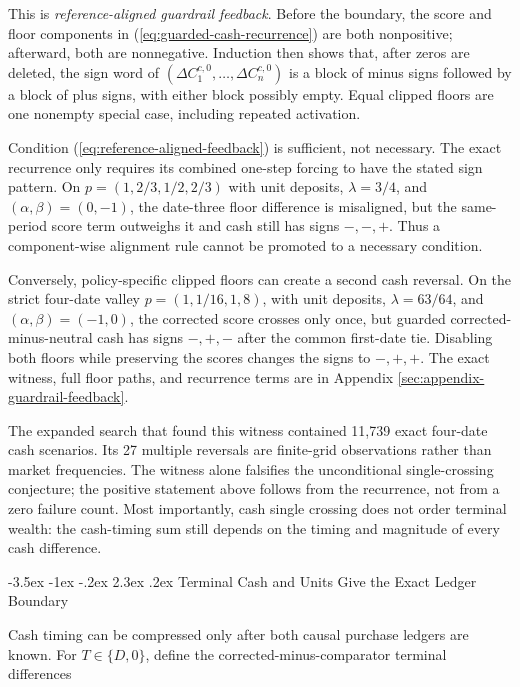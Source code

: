 \documentclass[12pt,a4paper,oneside]{report}
\makeatletter
\renewcommand\section{\@startsection{section}{1}{\z@}%
  {-3.5ex \@plus -1ex \@minus -.2ex}%
  {2.3ex \@plus .2ex}%
  {\normalfont\fontsize{14}{17}\selectfont\bfseries}}
\makeatother
\begin{document}
This is \emph{reference-aligned guardrail feedback}. Before the boundary, the
score and floor components in (\ref{eq:guarded-cash-recurrence}) are both
nonpositive; afterward, both are nonnegative. Induction then shows that, after
zeros are deleted, the sign word of
$(\Delta C_1^{c,0},\ldots,\Delta C_n^{c,0})$ is a block of minus signs followed
by a block of plus signs, with either block possibly empty. Equal clipped
floors are one nonempty special case, including repeated activation.

Condition (\ref{eq:reference-aligned-feedback}) is sufficient, not necessary.
The exact recurrence only requires its combined one-step forcing to have the
stated sign pattern. On
$p=(1,2/3,1/2,2/3)$ with unit deposits, $\lambda=3/4$, and
$(\alpha,\beta)=(0,-1)$, the date-three floor difference is misaligned, but
the same-period score term outweighs it and cash still has signs $-,-,+$.
Thus a component-wise alignment rule cannot be promoted to a necessary
condition.

Conversely, policy-specific clipped floors can create a second cash reversal.
On the strict four-date valley
$p=(1,1/16,1,8)$, with unit deposits, $\lambda=63/64$, and
$(\alpha,\beta)=(-1,0)$, the corrected score crosses only once, but guarded
corrected-minus-neutral cash has signs $-,+,-$ after the common first-date
tie. Disabling both floors while preserving the scores changes the signs to
$-,+,+$. The exact witness, full floor paths, and recurrence terms are in
Appendix \ref{sec:appendix-guardrail-feedback}.

The expanded search that found this witness contained 11,739 exact four-date
cash scenarios. Its 27 multiple reversals are finite-grid observations rather
than market frequencies. The witness alone falsifies the unconditional
single-crossing conjecture; the positive statement above follows from the
recurrence, not from a zero failure count. Most importantly, cash single
crossing does not order terminal wealth: the cash-timing sum still depends on
the timing and magnitude of every cash difference.

\section{Terminal Cash and Units Give the Exact Ledger Boundary}
\label{sec:terminal-inventory}

Cash timing can be compressed only after both causal purchase ledgers are
known. For $T\in\{D,0\}$, define the corrected-minus-comparator terminal
differences
\end{document}
